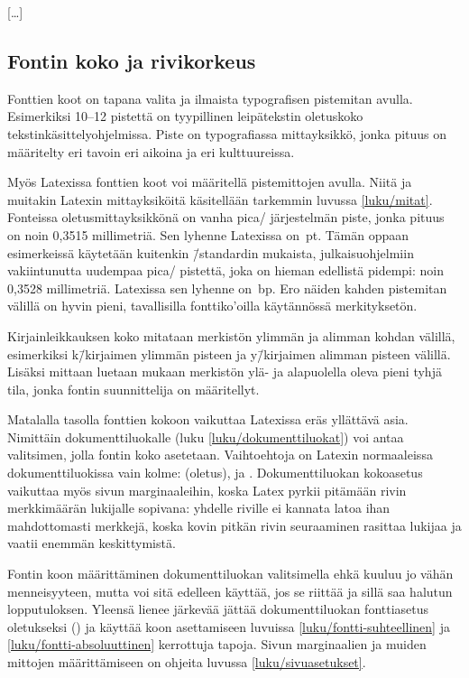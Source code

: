\begin{koodilohkosis}
[…]
\end{koodilohkosis}

\subsection{Fontin koko ja rivikorkeus}

Fonttien koot on tapana valita ja ilmaista typografisen pistemitan
avulla. Esimerkiksi 10--12 pistettä on tyypillinen leipätekstin
oletuskoko tekstinkäsittelyohjelmissa. Piste on typografiassa
mittayksikkö, jonka pituus on määritelty eri tavoin eri aikoina ja eri
kulttuureissa.

Myös Latexissa fonttien koot voi määritellä pistemittojen avulla. Niitä
ja muitakin Latexin mittayksiköitä käsitellään tarkemmin luvussa
\ref{luku/mitat}. Fonteissa oletusmittayksikkönä on vanha pica\-/
järjestelmän piste, jonka pituus on noin 0,3515 millimetriä. Sen lyhenne
Latexissa on~pt. Tämän oppaan esimerkeissä käytetään kuitenkin
 \=/standardin mukaista, julkaisuohjelmiin
vakiintunutta uudempaa pica\-/ pistettä, joka on hieman edellistä
pidempi: noin 0,3528 millimetriä. Latexissa sen lyhenne on~bp. Ero
näiden kahden pistemitan välillä on hyvin pieni, tavallisilla
fonttiko'oilla käytännössä merkityksetön.

Kirjainleikkauksen koko mitataan merkistön ylimmän ja alimman kohdan
välillä, esimerkiksi k\=/kirjaimen ylimmän pisteen ja y\=/kirjaimen
alimman pisteen välillä. Lisäksi mittaan luetaan mukaan merkistön ylä-
ja alapuolella oleva pieni tyhjä tila, jonka fontin suunnittelija on
määritellyt.

Matalalla tasolla fonttien kokoon vaikuttaa Latexissa eräs yllättävä
asia. Nimittäin dokumenttiluokalle (luku \ref{luku/dokumenttiluokat})
voi antaa valitsimen, jolla fontin koko asetetaan. Vaihtoehtoja on
Latexin normaaleissa dokumenttiluokissa vain kolme: \koodi{10pt}
(oletus), \koodi{11pt} ja \koodi{12pt}. Dokumenttiluokan kokoasetus
vaikuttaa myös sivun marginaaleihin, koska Latex pyrkii pitämään rivin
merkkimäärän lukijalle sopivana: yhdelle riville ei kannata latoa ihan
mahdottomasti merkkejä, koska kovin pitkän rivin seuraaminen rasittaa
lukijaa ja vaatii enemmän keskittymistä.

Fontin koon määrittäminen dokumenttiluokan valitsimella ehkä kuuluu jo
vähän menneisyyteen, mutta voi sitä edelleen käyttää, jos se riittää ja
sillä saa halutun lopputuloksen. Yleensä lienee järkevää jättää
dokumenttiluokan fonttiasetus oletukseksi (\koodi{10pt}) ja käyttää koon
asettamiseen luvuissa \ref{luku/fontti-suhteellinen} ja
\ref{luku/fontti-absoluuttinen} kerrottuja tapoja. Sivun marginaalien ja
muiden mittojen määrittämiseen on ohjeita luvussa
\ref{luku/sivuasetukset}.

